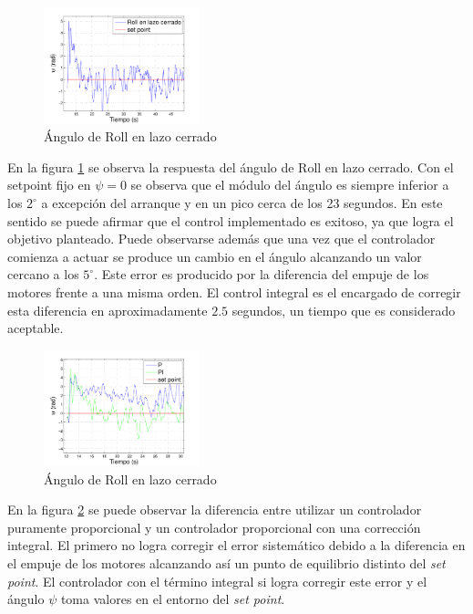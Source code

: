\documentclass[main]{subfiles}
\begin{document}
\begin{figure}
	\vspace{-20pt}
	\centering
	\includegraphics[width=0.4\textwidth]{./pics_test_control/psi.pdf}
	\caption{\'Angulo de Roll en lazo cerrado}
	\label{fig:psi}
\end{figure}

En la figura \ref{fig:psi} se observa la respuesta del \'angulo de Roll en lazo cerrado. Con el setpoint fijo en $\psi = 0$ se observa que el m\'odulo del \'angulo es siempre inferior a los $2^\circ$ a excepci\'on del arranque y en un pico cerca de los 23 segundos. En este sentido se puede afirmar que el control implementado es exitoso, ya que logra el objetivo planteado. Puede observarse adem\'as que una vez que el controlador comienza a actuar se produce un cambio en el \'angulo alcanzando un valor cercano a los $5 ^\circ$. Este error es producido por la diferencia del empuje de los motores frente a una misma orden. El control integral es el encargado de corregir esta diferencia en aproximadamente $2.5$ segundos, un tiempo que es considerado aceptable.\\

\begin{figure}
	\vspace{-20pt}
	\centering
	\includegraphics[width=0.4\textwidth]{./pics_test_control/psi_sin_con_int.pdf}
	\caption{\'Angulo de Roll en lazo cerrado}
	\label{fig:psi_sin_con_int}
\end{figure}

En la figura \ref{fig:psi_sin_con_int} se puede observar la diferencia entre utilizar un controlador puramente proporcional y un controlador proporcional con una correcci\'on integral. El primero no logra corregir el error sistem\'atico debido a la diferencia en el empuje de los motores alcanzando as\'i un punto de equilibrio distinto del \emph{set point}. El controlador con el t\'ermino integral si logra corregir este error y el \'angulo $\psi$ toma valores en el entorno del \emph{set point}.\\
\end{document}
